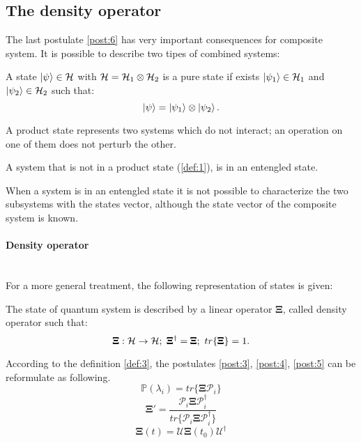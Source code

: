     \subsection{The density operator}
    \label{TheDensOp}
    The last postulate \ref{post:6} has very important consequences for composite system. It is possible
    to describe two tipes of combined systems:

    \begin{definition}
        A state $\ket{\psi}\in\mathcal{H}$ with $\mathcal{H}=\mathcal{H}_1\otimes\mathcal{H}_2$ is a
        pure state if exists $\ket{\psi_1}\in\mathcal{H}_1$ and $\ket{\psi_2}\in\mathcal{H}_2$
        such that:
        \begin{equation*}
            \ket{\psi}=\ket{\psi_1}\otimes\ket{\psi_2}.
        \end{equation*}
        \label{def:1}
    \end{definition}
    A product state represents two systems which do not interact; an operation on one of 
    them does not perturb the other.

    \begin{definition}
        A system that is not in a product state (\ref{def:1}), is in an entengled state. 
        \label{def:2}
    \end{definition}
    When a system is in an entengled state it is not possible to characterize the two subsystems
    with the states vector, although the state vector of the composite system is known.

    \paragraph{Density operator}\mbox{}\\
        For a more general treatment, the following representation of states is given:
        \begin{definition}
            The state of quantum system is described by a linear operator $\pmb{\Xi}$, called density
            operator such that:
            \begin{equation*}
                \pmb{\Xi}:\Hilbert\to\Hilbert;\ \pmb{\Xi}^\dagger=\pmb{\Xi};\ tr\{\pmb{\Xi}\}=1.
            \end{equation*}
            \label{def:3}
        \end{definition}
        According to the definition \ref{def:3}, the postulates \ref{post:3}, \ref{post:4},
        \ref{post:5} can be reformulate as following.
        \begin{equation}
            \mathbb{P}(\lambda_i)=tr\{\pmb{\Xi}\mathcal{P}_i\}
            \label{post:3.1}
        \end{equation}
        \begin{equation}
            \pmb{\Xi}'=\frac{\mathcal{P}_i\pmb{\Xi}\mathcal{P}_i^\dagger}
            {tr\{\mathcal{P}_i\pmb{\Xi}\mathcal{P}_i^\dagger\}}
            \label{post:4.1}
        \end{equation}
        \begin{equation}
            \pmb{\Xi}(t)=\mathcal{U}\pmb{\Xi}(t_0)\mathcal{U}^\dagger
            \label{post:5.1}
        \end{equation}